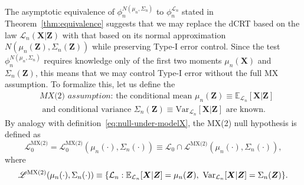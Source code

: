 \documentclass[ejs]{imsart}
\numberwithin{equation}{section}
\theoremstyle{plain}
\theoremstyle{definition}
\theoremstyle{remark}
\newcommand{\prx}{\bm X}
\newcommand{\prz}{\bm Z}
\begin{document}
The asymptotic equivalence of $\phi_n^{N(\mu_n, \Sigma_n)}$ to $\phi_n^{\mathcal L_n}$ stated in Theorem~\ref{thm:equivalence} suggests that we may replace the dCRT based on the law $\mathcal L_n(\prx|\prz)$ with that based on its normal approximation $N(\mu_n(\prz), \Sigma_n(\prz))$ while preserving Type-I error control. Since the test $\phi_n^{N(\mu_n, \Sigma_n)}$ requires knowledge only of the first two moments $\mu_n(\prx)$ and $\Sigma_n(\prz)$, this means that we may control Type-I error without the full MX assumption. To formalize this, let us define the 
\begin{equation}
	\begin{split}
&\textit{MX(2) assumption: } \text{the conditional mean } \mu_n(\prz) \equiv \mathbb E_{\mathcal L_n}[\prx|\prz] \\ 
&\text{ and conditional variance } \Sigma_n(\prz) \equiv \text{Var}_{\mathcal L_n}[\prx|\prz] \text{ are known}.
	\label{eq:mx-2-assumption}
	\end{split}
\end{equation}
By analogy with definition~\eqref{eq:null-under-modelX}, the MX(2) null hypothesis is defined as 
\begin{equation}
	\mathscr L_0^{\text{MX(2)}} = \mathscr L_0^{\text{MX(2)}}(\mu_n(\cdot), \Sigma_n(\cdot)) \equiv \mathscr L_{0} \cap \mathscr L^{\text{MX(2)}}(\mu_n(\cdot), \Sigma_n(\cdot)),
	\label{mx2-null}
\end{equation}
where
\begin{equation*}
	\begin{split}
		\mathscr L^{\textnormal{MX(2)}}(\mu_n(\cdot), \Sigma_n(\cdot)) \equiv \{\mathcal L_n: \mathbb E_{\mathcal L_n}[\prx|\prz] = \mu_n(\prz),\ \text{Var}_{\mathcal L_n}[\prx|\prz] = \Sigma_n(\prz)\}.
	\end{split}
\end{equation*}
\end{document}
